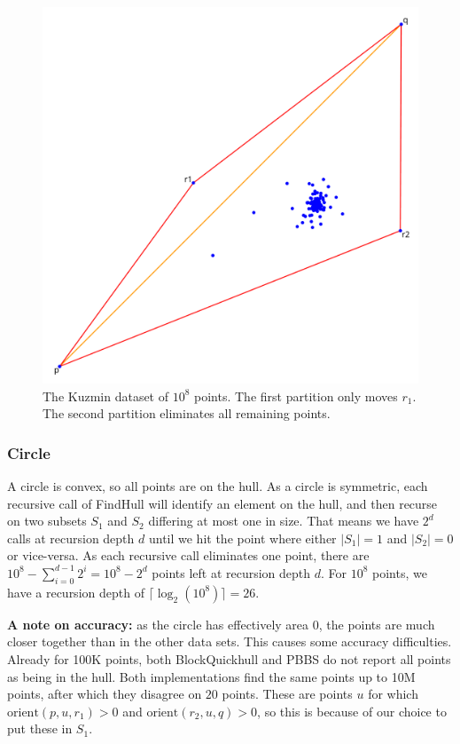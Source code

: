 \begin{figure}[ht]
    \includegraphics[width=\columnwidth]{figures/rust-kuzmin.png}
    \caption{The Kuzmin dataset of $10^8$ points. The first partition only
             moves $r_1$. The second partition eliminates all remaining points.}
    \label{fig:kuzmin}
\end{figure}

\subsubsection{Circle}

A circle is convex, so all points are on the hull. As a circle is symmetric,
each recursive call of FindHull will identify an element on the hull, and
then recurse on two subsets $S_1$ and $S_2$ differing at most one in size.
That means we have $2^d$ calls at recursion depth $d$ until we hit the point 
where either $|S_1| = 1$ and $|S_2| = 0$ or vice-versa. 
As each recursive call eliminates one point, there are
$10^8 - \sum_{i = 0}^{d - 1} 2^i = 10^8 - 2^{d}$ points left at recursion 
depth $d$. For $10^8$ points, we have a recursion depth of 
$\lceil \log_{2}(10^8) \rceil = 26$.

\textbf{A note on accuracy: }as the circle has effectively area $0$, the 
points are much closer together than in the other data sets.
This causes some accuracy difficulties. Already for 100K points, 
both BlockQuickhull and PBBS do not report all points as being in the hull. Both 
implementations find the same points up to 10M points, after which they disagree
on $20$ points. These are points $u$ for which $\text{orient}(p, u, r_1) > 0$
and $\text{orient}(r_2, u, q) > 0$, so this is because of our choice to put
these in $S_1$. 

